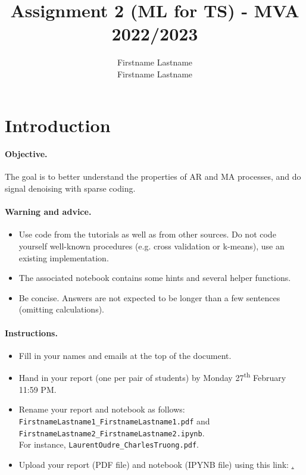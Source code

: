 \documentclass[11pt]{article}
\title{Assignment 2 (ML for TS) - MVA 2022/2023}
\author{
Firstname Lastname \email{youremail1@mail.com} \\ %
Firstname Lastname \email{youremail2@mail.com} %
}
\begin{document}
\maketitle

\section{Introduction}

\paragraph{Objective.} The goal is to better understand the properties of AR and MA processes, and do signal denoising with sparse coding.

\paragraph{Warning and advice.} 
\begin{itemize}
    \item Use code from the tutorials as well as from other sources. Do not code yourself well-known procedures (e.g. cross validation or k-means), use an existing implementation. 
    \item The associated notebook contains some hints and several helper functions.
    \item Be concise. Answers are not expected to be longer than a few sentences (omitting calculations).
\end{itemize}



\paragraph{Instructions.}
\begin{itemize}
    \item Fill in your names and emails at the top of the document.
    \item Hand in your report (one per pair of students) by Monday 27\textsuperscript{th} February 11:59 PM.
    \item Rename your report and notebook as follows:\\ \texttt{FirstnameLastname1\_FirstnameLastname1.pdf} and\\ \texttt{FirstnameLastname2\_FirstnameLastname2.ipynb}.\\
    For instance, \texttt{LaurentOudre\_CharlesTruong.pdf}.
    \item Upload your report (PDF file) and notebook (IPYNB file) using this link: \href{https://www.dropbox.com/request/nlddGUW3tQWKhEuBcBBf}.
\end{itemize}
\end{document}
